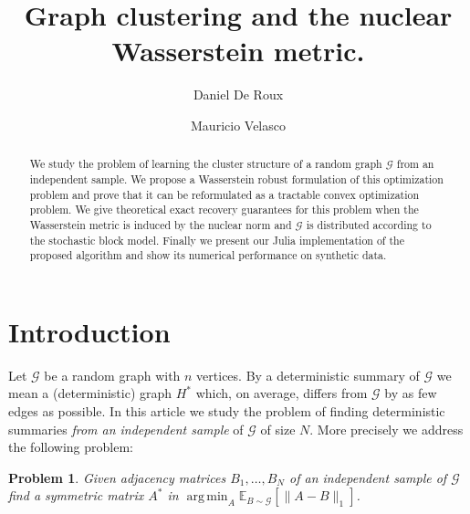 \documentclass[12pt]{amsart}
\newtheorem{problem}[lemma]{Problem}
\theoremstyle{remark}
\DeclareMathOperator*{\argmin}{arg\,min}
\newcommand{\EE}{\mathbb{E}}
\newcommand{\grG}{{\mathcal{G}}}
\begin{document}
\author{Daniel De Roux}
\address{
Departamento de matem\'aticas\\
Universidad de los Andes\\
Carrera $1^{\rm ra}\#18A-12$\\ 
Bogot\'a, Colombia
}

\author{Mauricio Velasco}
\address{
Departamento de matem\'aticas\\
Universidad de los Andes\\
Carrera $1^{\rm ra}\#18A-12$\\ 
Bogot\'a, Colombia
}


\begin{abstract} We study the problem of learning the cluster structure of a random graph $\grG$ from an independent sample. We propose a Wasserstein robust formulation of this optimization problem and prove that it can be reformulated as a tractable convex optimization problem. We give theoretical exact recovery guarantees for this problem when the Wasserstein metric is induced by the nuclear norm and $\grG$ is distributed according to the stochastic block model. Finally we present our Julia implementation of the proposed algorithm and show its numerical performance on synthetic data.
\end{abstract} 

\title{Graph clustering and the nuclear Wasserstein metric.}
\maketitle

\section{Introduction}


Let $\grG$ be a random graph with $n$ vertices. By a deterministic summary of $\grG$ we mean a (deterministic) graph $H^*$ which, on average, differs from $\grG$ by as few edges as possible. In this article we study the problem of finding deterministic summaries {\it from an independent sample} of $\grG$ of size $N$. More precisely we address the following problem:

\begin{problem}\label{Prob} Given adjacency matrices $B_1,\dots, B_N$ of an independent sample of $\grG$ find a symmetric matrix $A^*$ in $\argmin_A \EE_{B\sim \grG}[\|A-B\|_1]$. 
\end{problem}
\end{document}
